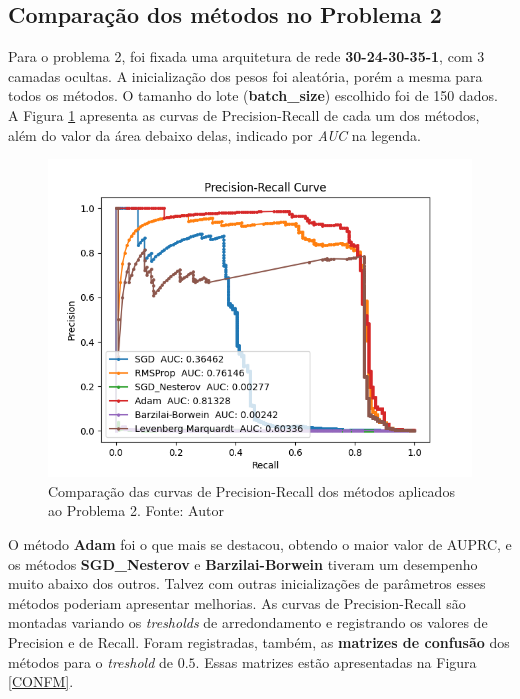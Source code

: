 \documentclass[11pt]{article}
\begin{document}
\subsection*{Comparação dos métodos no Problema 2}
Para o problema 2, foi fixada uma arquitetura de rede \textbf{30-24-30-35-1}, com 3 camadas ocultas. A inicialização dos pesos foi aleatória, porém a mesma para todos os métodos. O tamanho do lote (\textbf{batch\_size}) escolhido foi de 150 dados.
A Figura \ref{FRAUD} apresenta as curvas de Precision-Recall de cada um dos métodos, além do valor da área debaixo delas, indicado por \textit{AUC} na legenda.

\begin{figure}[H]
\center
\includegraphics[scale=0.8]{Figuras/FRAUD.png}
\caption{Comparação das curvas de Precision-Recall dos métodos aplicados ao Problema 2. Fonte: Autor} 
\label{FRAUD}
\end{figure}


\noindent
O método \textbf{Adam} foi o que mais se destacou, obtendo o maior valor de AUPRC, e os métodos \textbf{SGD\_Nesterov} e \textbf{Barzilai-Borwein} tiveram um desempenho muito abaixo dos outros. Talvez com outras inicializações de parâmetros esses métodos poderiam apresentar melhorias.
As curvas de Precision-Recall são montadas variando os \textit{tresholds} de arredondamento e registrando os valores de Precision e de Recall. Foram registradas, também, as \textbf{matrizes de confusão} dos métodos para o \textit{treshold} de $0.5$. Essas matrizes estão apresentadas na Figura \ref{CONFM}.
\end{document}
